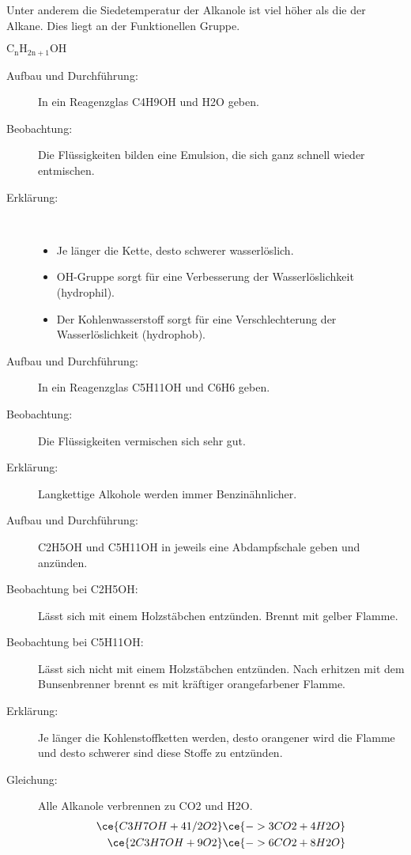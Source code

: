 Unter anderem die Siedetemperatur der Alkanole ist viel höher als die der Alkane.
Dies liegt an der Funktionellen Gruppe.

$\mathrm{C_nH_{2n+1}OH}$


\begin{description}
	\item[Aufbau und Durchführung:] In ein Reagenzglas \ac{C4H9OH} und \ac{H2O} geben.
	\item[Beobachtung:] Die Flüssigkeiten bilden eine Emulsion,
		die sich ganz schnell wieder entmischen.
	\item[Erklärung:]~
	\begin{itemize}
		\item Je länger die Kette, desto schwerer wasserlöslich.
		\item OH-Gruppe sorgt für eine Verbesserung der Wasserlöslichkeit (hydrophil).
		\item Der Kohlenwasserstoff sorgt für eine Verschlechterung der
			Wasserlöslichkeit (hydrophob).
	\end{itemize}
\end{description}

\begin{description}
	\item[Aufbau und Durchführung:] In ein Reagenzglas \ac{C5H11OH} und \ac{C6H6} geben.
	\item[Beobachtung:] Die Flüssigkeiten vermischen sich sehr gut.
	\item[Erklärung:] Langkettige Alkohole werden immer Benzinähnlicher.
\end{description}

\begin{description}
	\item[Aufbau und Durchführung:] \ac{C2H5OH} und \ac{C5H11OH} in jeweils eine Abdampfschale geben
		und anzünden.
	\item[Beobachtung bei \ac{C2H5OH}:] Lässt sich mit einem Holzstäbchen entzünden.
		Brennt mit gelber Flamme.
	\item[Beobachtung bei \ac{C5H11OH}:] Lässt sich nicht mit einem Holzstäbchen entzünden.
		Nach erhitzen mit dem Bunsenbrenner brennt es mit kräftiger orangefarbener Flamme.
	\item[Erklärung:] Je länger die Kohlenstoffketten werden,
		desto orangener wird die Flamme und desto schwerer sind diese Stoffe zu entzünden.
	\item[Gleichung:] Alle Alkanole verbrennen zu \ac{CO2} und \ac{H2O}.
	\begin{align}
		\ce{C3H7OH + 4 1/2O2}	& \ce{-> 3CO2 + 4H2O} \\
		\ce{2C3H7OH + 9O2}	& \ce{-> 6CO2 + 8H2O}
	\end{align}
\end{description}

